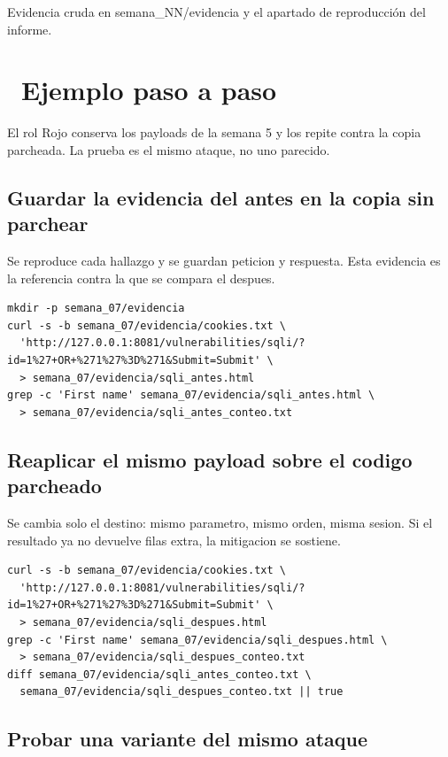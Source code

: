 \documentclass[11pt,a4paper]{article}
\newcommand{\iconotexto}[2]{\textcolor{cyanNeon}{\faIcon{#1}}~#2}
\begin{document}
Evidencia cruda en semana\_NN/evidencia y el apartado de reproducción del informe.

\section{\iconotexto{list-ol}{Ejemplo paso a paso}}

El rol Rojo conserva los payloads de la semana 5 y los repite contra la copia parcheada. La prueba es el mismo ataque, no uno parecido.

\subsection{Guardar la evidencia del antes en la copia sin parchear}

Se reproduce cada hallazgo y se guardan peticion y respuesta. Esta evidencia es la referencia contra la que se compara el despues.

\begin{lstlisting}[style=estiloCodigo]
mkdir -p semana_07/evidencia
curl -s -b semana_07/evidencia/cookies.txt \
  'http://127.0.0.1:8081/vulnerabilities/sqli/?id=1%27+OR+%271%27%3D%271&Submit=Submit' \
  > semana_07/evidencia/sqli_antes.html
grep -c 'First name' semana_07/evidencia/sqli_antes.html \
  > semana_07/evidencia/sqli_antes_conteo.txt
\end{lstlisting}

\subsection{Reaplicar el mismo payload sobre el codigo parcheado}

Se cambia solo el destino: mismo parametro, mismo orden, misma sesion. Si el resultado ya no devuelve filas extra, la mitigacion se sostiene.

\begin{lstlisting}[style=estiloCodigo]
curl -s -b semana_07/evidencia/cookies.txt \
  'http://127.0.0.1:8081/vulnerabilities/sqli/?id=1%27+OR+%271%27%3D%271&Submit=Submit' \
  > semana_07/evidencia/sqli_despues.html
grep -c 'First name' semana_07/evidencia/sqli_despues.html \
  > semana_07/evidencia/sqli_despues_conteo.txt
diff semana_07/evidencia/sqli_antes_conteo.txt \
  semana_07/evidencia/sqli_despues_conteo.txt || true
\end{lstlisting}

\subsection{Probar una variante del mismo ataque}
\end{document}
